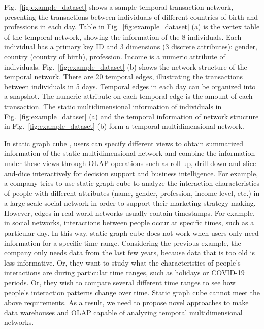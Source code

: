 \documentclass[10pt,journal,compsoc]{IEEEtran}
\begin{document}
\begin{example} \label{exam:temp_multi_network}
	Fig.~\ref{fig:example_dataset} shows a sample temporal transaction network, presenting the transactions between individuals of different countries of birth and professions in each day. Table in Fig.~\ref{fig:example_dataset} (a) is the vertex table of the temporal network, showing the information of the 8 individuals. Each individual has a primary key ID and 3 dimensions (3 discrete attributes): gender, country (country of birth), profession. Income is a numeric attribute of individuals. Fig.~\ref{fig:example_dataset} (b) shows the network structure of the temporal network. There are 20 temporal edges, illustrating the transactions between individuals in 5 days. Temporal edges in each day can be organized into a snapshot. The numeric attribute on each temporal edge is the amount of each transaction. The static multidimensional information of individuals in Fig.~\ref{fig:example_dataset} (a) and the temporal information of network structure in Fig.~\ref{fig:example_dataset} (b) form a temporal multidimensional network.
\end{example}
In static graph cube \cite{zhao2011graph}, users can specify different views to obtain summarized information of the static multidimensional network and combine the information under these views through OLAP operations such as roll-up, drill-down and slice-and-dice interactively for decision support and business intelligence. For example, a company tries to use static graph cube to analyze the interaction characteristics of people with different attributes (name, gender, profession, income level, etc.) in a large-scale social network in order to support their marketing strategy making. However, edges in real-world networks usually contain timestamps. For example, in social networks, interactions between people occur at specific times, such as a particular day. In this way, static graph cube does not work when users only need information for a specific time range. Considering the previous example, the company only needs data from the last few years, because data that is too old is less informative. Or, they want to study what the characteristics of people's interactions are during particular time ranges, such as holidays or COVID-19 periods. Or, they wish to compare several different time ranges to see how people's interaction patterns change over time. Static graph cube cannot meet the above requirements. As a result, we need to propose novel approaches to make data warehouses and OLAP capable of analyzing temporal multidimensional networks.
\end{document}
